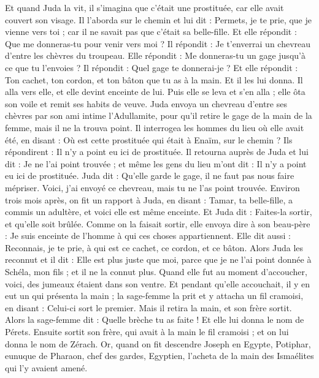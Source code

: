 \begin{multicols}{2}
Et quand Juda la vit, il s'imagina que c'était une prostituée, car elle avait couvert son visage.
Il l’aborda sur le chemin et lui dit : Permets, je te prie, que je vienne vers toi ; car il ne savait pas que c’était sa belle-fille. Et elle répondit : Que me donneras-tu pour venir vers moi ?
Il répondit : Je t'enverrai un chevreau d'entre les chèvres du troupeau. Elle répondit : Me donneras-tu un gage jusqu'à ce que tu l'envoies ?
Il répondit : Quel gage te donnerai-je ? Et elle répondit : Ton cachet, ton cordon, et ton bâton que tu as à la main. Et il les lui donna. Il alla vers elle, et elle devint enceinte de lui.
Puis elle se leva et s'en alla ; elle ôta son voile et remit ses habits de veuve.
Juda envoya un chevreau d'entre ses chèvres par son ami intime l’Adullamite, pour qu'il retire le gage de la main de la femme, mais il ne la trouva point.
Il interrogea les hommes du lieu où elle avait été, en disant : Où est cette prostituée qui était à Enaïm, sur le chemin ? Ils répondirent : Il n'y a point eu ici de prostituée.
Il retourna auprès de Juda et lui dit : Je ne l'ai point trouvée ; et même les gens du lieu m'ont dit : Il n'y a point eu ici de prostituée.
Juda dit : Qu'elle garde le gage, il ne faut pas nous faire mépriser. Voici, j'ai envoyé ce chevreau, mais tu ne l'as point trouvée.
Environ trois mois après, on fit un rapport à Juda, en disant : Tamar, ta belle-fille, a commis un adultère, et voici elle est même enceinte. Et Juda dit : Faites-la sortir, et qu'elle soit brûlée.
Comme on la faisait sortir, elle envoya dire à son beau-père : Je suis enceinte de l'homme à qui ces choses appartiennent. Elle dit aussi : Reconnais, je te prie, à qui est ce cachet, ce cordon, et ce bâton.
Alors Juda les reconnut et il dit : Elle est plus juste que moi, parce que je ne l'ai point donnée à Schéla, mon fils ; et il ne la connut plus.
Quand elle fut au moment d'accoucher, voici, des jumeaux étaient dans son ventre.
Et pendant qu’elle accouchait, il y en eut un qui présenta la main ; la sage-femme la prit et y attacha un fil cramoisi, en disant : Celui-ci sort le premier.
Mais il retira la main, et son frère sortit. Alors la sage-femme dit : Quelle brèche tu as faite ! Et elle lui donna le nom de Pérets.
Ensuite sortit son frère, qui avait à la main le fil cramoisi ; et on lui donna le nom de Zérach.
\VerseOne{}Or, quand on fit descendre Joseph en Egypte, Potiphar, eunuque de Pharaon, chef des gardes, Egyptien, l'acheta de la main des Ismaélites qui l'y avaient amené.

\end{multicols}
